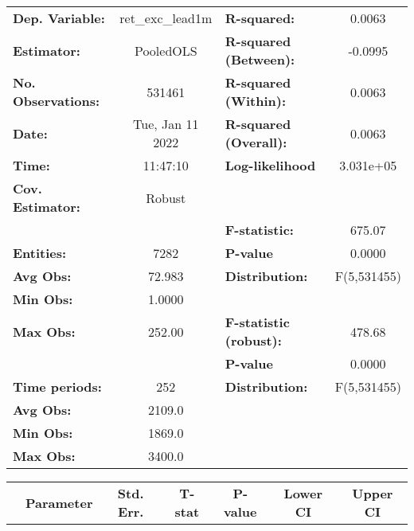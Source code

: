 \begin{center}
\begin{tabular}{lclc}
\toprule
\textbf{Dep. Variable:}    &  ret\_exc\_lead1m  & \textbf{  R-squared:         }   &      0.0063      \\
\textbf{Estimator:}        &     PooledOLS      & \textbf{  R-squared (Between):}  &     -0.0995      \\
\textbf{No. Observations:} &       531461       & \textbf{  R-squared (Within):}   &      0.0063      \\
\textbf{Date:}             &  Tue, Jan 11 2022  & \textbf{  R-squared (Overall):}  &      0.0063      \\
\textbf{Time:}             &      11:47:10      & \textbf{  Log-likelihood     }   &    3.031e+05     \\
\textbf{Cov. Estimator:}   &       Robust       & \textbf{                     }   &                  \\
\textbf{}                  &                    & \textbf{  F-statistic:       }   &      675.07      \\
\textbf{Entities:}         &        7282        & \textbf{  P-value            }   &      0.0000      \\
\textbf{Avg Obs:}          &       72.983       & \textbf{  Distribution:      }   &   F(5,531455)    \\
\textbf{Min Obs:}          &       1.0000       & \textbf{                     }   &                  \\
\textbf{Max Obs:}          &       252.00       & \textbf{  F-statistic (robust):} &      478.68      \\
\textbf{}                  &                    & \textbf{  P-value            }   &      0.0000      \\
\textbf{Time periods:}     &        252         & \textbf{  Distribution:      }   &   F(5,531455)    \\
\textbf{Avg Obs:}          &       2109.0       & \textbf{                     }   &                  \\
\textbf{Min Obs:}          &       1869.0       & \textbf{                     }   &                  \\
\textbf{Max Obs:}          &       3400.0       & \textbf{                     }   &                  \\
\bottomrule
\end{tabular}
\begin{tabular}{lcccccc}
                & \textbf{Parameter} & \textbf{Std. Err.} & \textbf{T-stat} & \textbf{P-value} & \textbf{Lower CI} & \textbf{Upper CI}  \\

\end{tabular}
\end{center}

